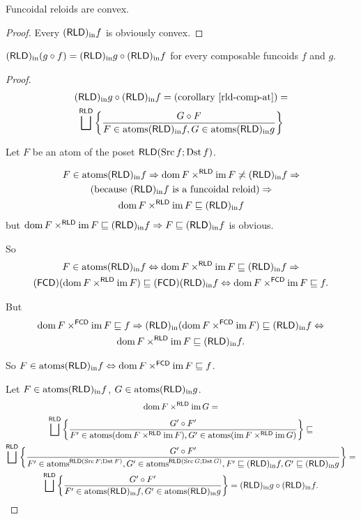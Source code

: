 \begin{cor}
Funcoidal reloids are convex.\end{cor}
\begin{proof}
Every $\torldin f$ is obviously convex.\end{proof}
\begin{thm}
$\torldin(g\circ f)=\torldin g\circ\torldin f$ for every composable
funcoids $f$ and $g$.\end{thm}
\begin{proof}
~
\begin{multline*}
\torldin g\circ\torldin f=\text{(corollary \ref{rld-comp-at})}=\\
\bigsqcup^{\mathsf{RLD}}\setcond{G\circ F}{F\in\atoms\torldin f,G\in\atoms\torldin g}
\end{multline*}


Let $F$ be an atom of the poset $\mathsf{RLD}(\Src f;\Dst f)$.

\begin{multline*}
F\in\atoms\torldin f\Rightarrow\dom F\times^{\mathsf{RLD}}\im F\nasymp\torldin f\Rightarrow\\
\text{(because \ensuremath{\torldin f} is a funcoidal reloid)}\Rightarrow\\
\dom F\times^{\mathsf{RLD}}\im F\sqsubseteq\torldin f
\end{multline*}
 but $\dom F\times^{\mathsf{RLD}}\im F\sqsubseteq\torldin f\Rightarrow F\sqsubseteq\torldin f$
is obvious.

So 
\begin{multline*}
F\in\atoms\torldin f\Leftrightarrow\dom F\times^{\mathsf{RLD}}\im F\sqsubseteq\torldin f\Rightarrow\\
\tofcd(\dom F\times^{\mathsf{RLD}}\im F)\sqsubseteq\tofcd\torldin f\Leftrightarrow\dom F\times^{\mathsf{FCD}}\im F\sqsubseteq f.
\end{multline*}


But 
\begin{multline*}
\dom F\times^{\mathsf{FCD}}\im F\sqsubseteq f\Rightarrow\torldin(\dom F\times^{\mathsf{FCD}}\im F)\sqsubseteq\torldin f\Leftrightarrow\\
\dom F\times^{\mathsf{RLD}}\im F\sqsubseteq\torldin f.
\end{multline*}


So $F\in\atoms\torldin f\Leftrightarrow\dom F\times^{\mathsf{FCD}}\im F\sqsubseteq f$.

Let $F\in\atoms\torldin f$, $G\in\atoms\torldin g$.
\begin{multline*}
\dom F\times^{\mathsf{RLD}}\im G=\\
\bigsqcup^{\mathsf{RLD}}\setcond{G'\circ F'}{F'\in\atoms(\dom F\times^{\mathsf{RLD}}\im F),G'\in\atoms(\im F\times^{\mathsf{RLD}}\im G)}\sqsubseteq\\
\bigsqcup^{\mathsf{RLD}}\setcond{G'\circ F'}{F'\in\atoms^{\mathsf{RLD}(\Src F;\Dst F)},G'\in\atoms^{\mathsf{RLD}(\Src G;\Dst G)},F'\sqsubseteq\torldin f,G'\sqsubseteq\torldin g}=\\
\bigsqcup^{\mathsf{RLD}}\setcond{G'\circ F'}{F'\in\atoms\torldin f,G'\in\atoms\torldin g}=\torldin g\circ\torldin f.
\end{multline*}



\end{proof}
